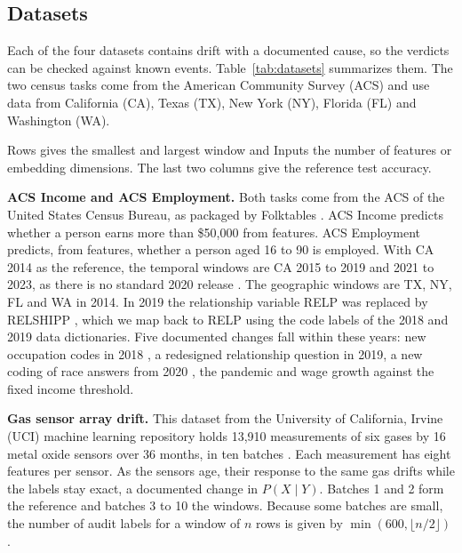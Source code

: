 \documentclass[10pt]{article}
\newcommand{\keep}[1]{\needspace{#1\baselineskip}}
\begin{document}
\keep{19}\subsection{Datasets}
Each of the four datasets contains drift with a documented cause, so the verdicts can be checked against known events. Table~\ref{tab:datasets} summarizes them. The two census tasks come from the American Community Survey (ACS) and use data from California (CA), Texas (TX), New York (NY), Florida (FL) and Washington (WA).

\begin{table}[H]
\centering
\caption{Datasets, drift windows and reference accuracy}
\label{tab:datasets}

\end{table}

Rows gives the smallest and largest window and Inputs the number of features or embedding dimensions. The last two columns give the reference test accuracy.

\textbf{ACS Income and ACS Employment.} Both tasks come from the ACS of the United States Census Bureau, as packaged by Folktables \cite{ding2021retiring}. ACS Income predicts whether a person earns more than \$50{,}000 from  features. ACS Employment predicts, from  features, whether a person aged 16 to 90 is employed. With CA 2014 as the reference, the temporal windows are CA 2015 to 2019 and 2021 to 2023, as there is no standard 2020 release \cite{census2021experimental}. The geographic windows are TX, NY, FL and WA in 2014. In 2019 the relationship variable RELP was replaced by RELSHIPP \cite{census2019pums}, which we map back to RELP using the code labels of the 2018 and 2019 data dictionaries. Five documented changes fall within these years: new occupation codes in 2018 \cite{census2020occupation}, a redesigned relationship question in 2019, a new coding of race answers from 2020 \cite{census2021race}, the pandemic and wage growth against the fixed income threshold.

\textbf{Gas sensor array drift.} This dataset from the University of California, Irvine (UCI) machine learning repository holds 13{,}910 measurements of six gases by 16 metal oxide sensors over 36 months, in ten batches \cite{vergara2012gas,rodriguezlujan2014gas}. Each measurement has eight features per sensor. As the sensors age, their response to the same gas drifts while the labels stay exact, a documented change in $P(X\mid Y)$. Batches 1 and 2 form the reference and batches 3 to 10 the windows. Because some batches are small, the number of audit labels for a window of $n$ rows is given by $\min(600,\lfloor n/2\rfloor)$.
\end{document}
